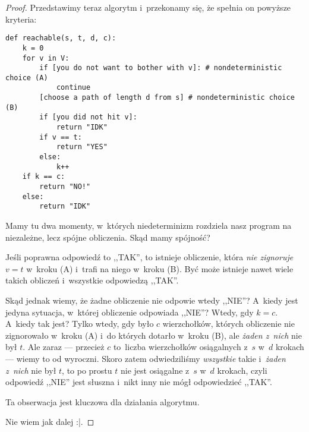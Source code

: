 \begin{proof}
	Przedstawimy teraz algorytm i~przekonamy się, że spełnia on powyższe kryteria:
	\begin{verbatim}
def reachable(s, t, d, c):
    k = 0
    for v in V:
        if [you do not want to bother with v]: # nondeterministic choice (A)
            continue
        [choose a path of length d from s] # nondeterministic choice (B)
        if [you did not hit v]:
            return "IDK"
        if v == t:
            return "YES"
        else:
            k++
    if k == c:
        return "NO!"
    else:
        return "IDK"
\end{verbatim}
	Mamy tu dwa momenty, w~których niedeterminizm rozdziela nasz program na niezależne, lecz spójne obliczenia. Skąd mamy spójność?

	Jeśli poprawna odpowiedź to ,,TAK'', to istnieje obliczenie, która \emph{nie zignoruje} \(v = t\) w~kroku (A) i~trafi na niego w~kroku (B). Być może istnieje nawet wiele takich obliczeń i~wszystkie odpowiedzą ,,TAK''.

	Skąd jednak wiemy, że żadne obliczenie nie odpowie wtedy ,,NIE''? A~kiedy jest jedyna sytuacja, w~której obliczenie odpowiada ,,NIE''? Wtedy, gdy \(k = c\). A~kiedy tak jest? Tylko wtedy, gdy było \(c\) wierzchołków, których obliczenie nie zignorowało w~kroku (A) i~do których dotarło w~kroku (B), ale \emph{żaden z~nich} nie był \(t\). Ale zaraz --- przecież \(c\) to~liczba wierzchołków osiągalnych z~\(s\) w~\(d\) krokach --- wiemy to od wyroczni. Skoro zatem odwiedziliśmy \emph{wszystkie} takie i~\emph{żaden z~nich} nie był \(t\), to po prostu \(t\) nie jest osiągalne z~\(s\) w~\(d\) krokach, czyli odpowiedź ,,NIE'' jest słuszna i~nikt inny nie mógł odpowiedzieć ,,TAK''.

	Ta obserwacja jest kluczowa dla działania algorytmu.

	Nie wiem jak dalej :|.

\end{proof}